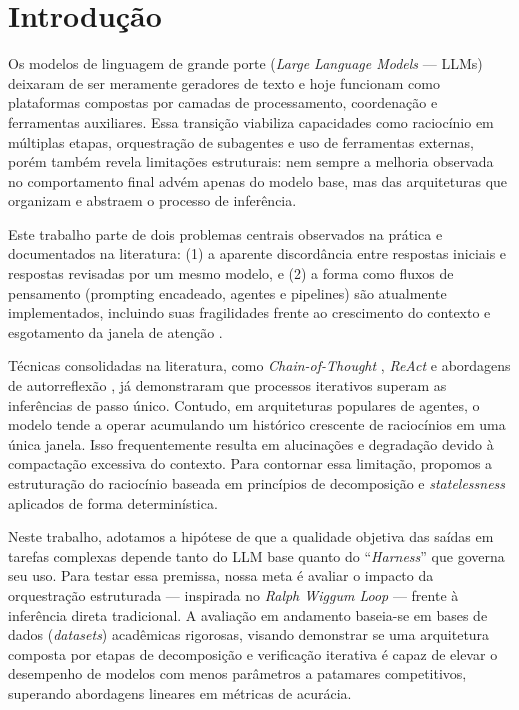 \documentclass[a4paper,10pt,twocolumn]{article}
\begin{document}
\section{Introdução}

Os modelos de linguagem de grande porte (\textit{Large Language Models} --- LLMs) deixaram de ser meramente geradores de texto e hoje funcionam como plataformas compostas por camadas de processamento, coordenação e ferramentas auxiliares. Essa transição viabiliza capacidades como raciocínio em múltiplas etapas, orquestração de subagentes e uso de ferramentas externas, porém também revela limitações estruturais: nem sempre a melhoria observada no comportamento final advém apenas do modelo base, mas das arquiteturas que organizam e abstraem o processo de inferência.

Este trabalho parte de dois problemas centrais observados na prática e documentados na literatura: (1) a aparente discordância entre respostas iniciais e respostas revisadas por um mesmo modelo, e (2) a forma como fluxos de pensamento (prompting encadeado, agentes e pipelines) são atualmente implementados, incluindo suas fragilidades frente ao crescimento do contexto e esgotamento da janela de atenção \cite{liu2023lost}.

Técnicas consolidadas na literatura, como \textit{Chain-of-Thought} \cite{wei2022chain}, \textit{ReAct} \cite{yao2022react} e abordagens de autorreflexão \cite{shinn2023reflexion}, já demonstraram que processos iterativos superam as inferências de passo único. Contudo, em arquiteturas populares de agentes, o modelo tende a operar acumulando um histórico crescente de raciocínios em uma única janela. Isso frequentemente resulta em alucinações e degradação devido à compactação excessiva do contexto. Para contornar essa limitação, propomos a estruturação do raciocínio baseada em princípios de decomposição e \textit{statelessness} aplicados de forma determinística.

Neste trabalho, adotamos a hipótese de que a qualidade objetiva das saídas em tarefas complexas depende tanto do LLM base quanto do ``\textit{Harness}'' que governa seu uso. Para testar essa premissa, nossa meta é avaliar o impacto da orquestração estruturada --- inspirada no \textit{Ralph Wiggum Loop} \cite{ghuntley2025ralph} --- frente à inferência direta tradicional. A avaliação em andamento baseia-se em bases de dados (\textit{datasets}) acadêmicas rigorosas, visando demonstrar se uma arquitetura composta por etapas de decomposição e verificação iterativa é capaz de elevar o desempenho de modelos com menos parâmetros a patamares competitivos, superando abordagens lineares em métricas de acurácia.
\end{document}
